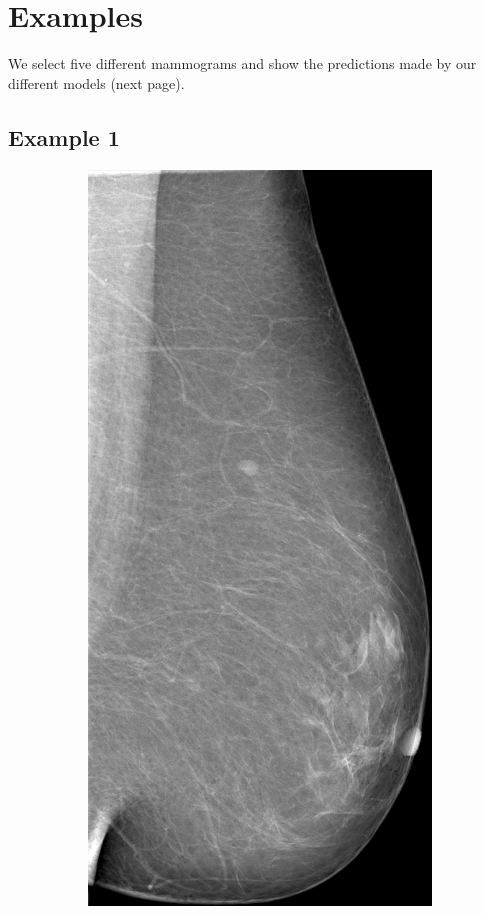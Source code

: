 \chapter{Examples}
\label{app:examples}
We select five different mammograms and show the predictions made by our different models (next page).

\newpage
\section{Example 1}
\begin{figure}[h]
	\centering
	\begin{subfigure}{0.2\textwidth}
		\centering
			\includegraphics[width=\textwidth]{plots/examples/mammogram_1.png}

\end{subfigure}
\end{figure}
